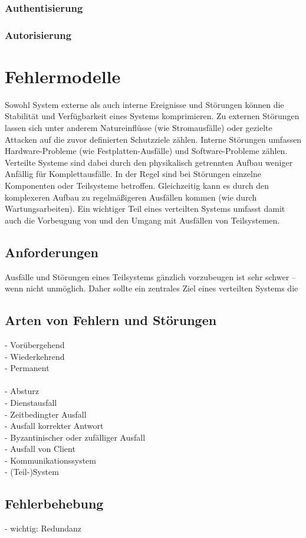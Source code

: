 \documentclass[12pt,a4paper,parskip=half]{scrreprt}
\begin{document}
\subsection{Authentisierung}


\subsection{Autorisierung}


\chapter{Fehlermodelle}
Sowohl System externe als auch interne Ereignisse und Störungen können die Stabilität und Verfügbarkeit eines Systems komprimieren. Zu externen Störungen lassen sich unter anderem Natureinflüsse (wie Stromausfälle) oder gezielte Attacken auf die zuvor definierten Schutzziele zählen. Interne Störungen umfassen Hardware-Probleme (wie Festplatten-Ausfälle) und Software-Probleme zählen. Verteilte Systeme sind dabei durch den physikalisch getrennten Aufbau weniger Anfällig für Komplettausfälle. In der Regel sind bei Störungen einzelne Komponenten oder Teilsysteme betroffen. Gleichzeitig kann es durch den komplexeren Aufbau zu regelmäßigeren Ausfällen kommen (wie durch Wartungsarbeiten). Ein wichtiger Teil eines verteilten Systems umfasst damit auch die Vorbeugung von und den Umgang mit Ausfällen von Teilsystemen.

\section{Anforderungen}
Ausfälle und Störungen eines Teilsystems gänzlich vorzubeugen ist sehr schwer -- wenn nicht unmöglich. Daher sollte ein zentrales Ziel eines verteilten Systems die 


\section{Arten von Fehlern und Störungen}
- Vorübergehend\\
- Wiederkehrend\\
- Permanent\\
\\
- Absturz\\
- Dienstausfall\\
- Zeitbedingter Ausfall\\
- Ausfall korrekter Antwort\\
- Byzantinischer oder zufälliger Ausfall
\\
- Ausfall von Client\\
- Kommunikationssystem\\
- (Teil-)System\\

\section{Fehlerbehebung}
- wichtig: Redundanz\\


\newpage

\nocite{*}
\thispagestyle{headings}


 
\end{document}
